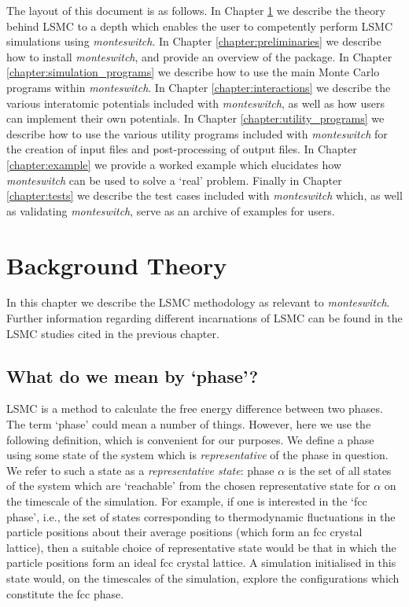 \documentclass{report}
\begin{document}
The layout of this document is as follows. In Chapter \ref{chapter:background} we describe the theory behind LSMC to a depth which enables the user to 
competently perform LSMC simulations using \emph{monteswitch}.
In Chapter \ref{chapter:preliminaries} we describe how to install \emph{monteswitch}, and provide
an overview of the package. In Chapter \ref{chapter:simulation_programs} we describe how to use the main Monte Carlo programs within
\emph{monteswitch}. In Chapter \ref{chapter:interactions} we describe the various interatomic potentials included with \emph{monteswitch}, as well as
how users can implement their own potentials. In Chapter \ref{chapter:utility_programs} we describe how to use the various utility
programs included with \emph{monteswitch} for the creation of input files and post-processing of output files. In Chapter \ref{chapter:example}
we provide a worked example which elucidates how \emph{monteswitch} can be used to solve a `real' problem. Finally in Chapter \ref{chapter:tests}
we describe the test cases included with \emph{monteswitch} which, as well as validating \emph{monteswitch}, serve as an archive of examples
for users.




\chapter{Background Theory}\label{chapter:background}
In this chapter we describe the LSMC methodology as relevant to \emph{monteswitch}. Further information regarding different incarnations of
LSMC can be found in the LSMC studies cited in the previous chapter.

\section{What do we mean by `phase'?}\label{sec:phase}
LSMC is a method to calculate the free energy difference between two phases. The term `phase' could mean a number of things. However, here
we use the following definition, which is convenient for our purposes. We define a phase using some state of the system
which is \emph{representative} of the phase in question. We refer to such a state as a \emph{representative state}: phase $\alpha$ is the 
set of all states of the system which are `reachable' from the chosen representative state for $\alpha$ on the timescale of the simulation. 
For example, if one is interested in the `fcc phase', i.e., the set of states 
corresponding to thermodynamic fluctuations in the particle positions about their average positions (which form an fcc crystal
lattice), then a suitable choice of representative state would be that in which the particle positions form an ideal fcc crystal lattice. A
simulation initialised in this state would, on the timescales of the simulation, explore the configurations which
constitute the fcc phase.
\end{document}
